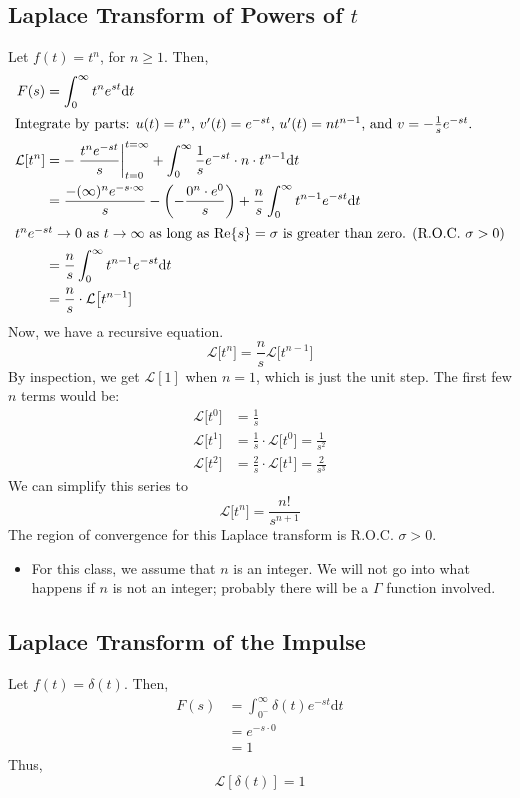 \documentclass[10pt]{article}
\newcommand{\laplace}{\mathcal{L}}
\newcommand{\dd}{\text{d}}
\begin{document}
\subsection*{Laplace Transform of Powers of $t$}
Let $f(t) = t^n$, for $n \geq 1$.  Then,
\begin{align*}
    F(s) &= \int_0^\infty t^n e^{st} \dd t\\
    \intertext{Integrate by parts: $u(t) = t^n$, $v'(t) = e^{-st}$, $u'(t) = nt^{n - 1}$, and $v = -\frac{1}{s} e^{-st}$.}
    \laplace[t^n] &= -\left.\frac{t^n e^{-st}}{s}\right|_{t=0}^{t=\infty} + \int_0^\infty \frac{1}{s} e^{-st} \cdot n \cdot t^{n-1} \dd t\\
    &= \frac{-(\infty)^n e^{-s\cdot \infty}}{s} - \left(-\frac{0^n \cdot e^0}{s}\right) + \frac{n}{s} \int_0^\infty t^{n-1} e^{-st} \dd t\\
    \intertext{$t^n e^{-st} \rightarrow 0$ as $t \rightarrow \infty$ as long as $\text{Re}\{s\} = \sigma$ is greater than zero.  (R.O.C. $\sigma > 0$)}
    &= \frac{n}{s} \int_0^\infty t^{n-1} e^{-st} \dd t\\
    &= \frac{n}{s} \cdot \laplace\big[t^{n-1}]
\end{align*}
Now, we have a recursive equation.
\[\laplace\big[t^n] = \frac{n}{s} \laplace\big[t^{n-1}]\]
By inspection, we get $\laplace[1]$ when $n = 1$, which is just the unit step.
The first few $n$ terms would be:
\begin{align*}
    \laplace\big[t^0] &= \frac{1}{s}\\
    \laplace\big[t^1] &= \frac{1}{s} \cdot \laplace\big[t^0] = \frac{1}{s^2}\\
    \laplace\big[t^2] &= \frac{2}{s} \cdot \laplace\big[t^1] = \frac{2}{s^3}
\end{align*}
We can simplify this series to
\[\boxed{\laplace\big[t^n] = \frac{n!}{s^{n + 1}}}\]
The region of convergence for this Laplace transform is $\text{R.O.C. } \sigma > 0$.\\
\begin{itemize}
    \item For this class, we assume that $n$ is an integer.  We will not go into what happens if $n$ is not an integer; probably there will be a $\Gamma$ function involved.
\end{itemize}
\subsection*{Laplace Transform of the Impulse}
Let $f(t) = \delta(t)$.  Then,
\begin{align*}
    F(s) &= \int_{0^-}^\infty \delta(t) e^{-st} \dd t\\
    &= e^{-s \cdot 0}\\
    &= 1
\end{align*}
Thus, 
\[\boxed{\laplace[\delta(t)] = 1}\]
\end{document}
